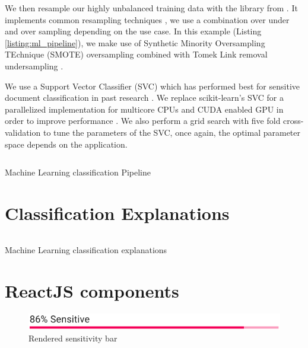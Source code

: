 \documentclass{l4proj}
\begin{document}
We then resample our highly unbalanced training data with the \textcite{ScikitlearncontribImbalancedlearn2020} library from \textcite{lemaitreImbalancedlearnPythonToolbox2017}.
It implements common resampling techniques \autocite{lemaitreImbalancedlearnPythonToolbox2017}, we use a combination over under and over sampling depending on the use case.
In this example (Listing \ref{listing:ml_pipeline}), we make use of Synthetic Minority Oversampling TEchnique (SMOTE) oversampling combined with Tomek Link removal undersampling \autocite{batistaStudyBehaviorSeveral2004}.

We use a Support Vector Classifier (SVC) which has performed best for sensitive document classification in past research \autocite{mcdonaldClassifierDigitalSensitivity2014,mcdonaldStudySVMKernel2017}.
We replace scikit-learn's SVC for a parallelized implementation for multicore CPUs and CUDA enabled GPU in order to improve performance \autocite{wenThunderSVMFastSVM2018}.
We also perform a grid search with five fold cross-validation to tune the parameters of the SVC, once again, the optimal parameter space depends on the application.

\begin{listing}[H]
    \inputminted{python}{code/ml_pipeline.py}
    \caption{Machine Learning classification Pipeline}
    \label{listing:ml_pipeline}
\end{listing}

\section{Classification Explanations}

\begin{listing}[H]
    \inputminted{python}{code/explanations.py}
    \caption{Machine Learning classification explanations}
    \label{listing:ml_explanations}
\end{listing}

\section{ReactJS components}

\begin{figure}
    \includegraphics[width=\linewidth]{figures/sensitivity_bar.pdf}
    \caption{Rendered sensitivity bar}

    \vspace{-10pt}
    \label{fig:sensitivity_bar_preview}
\end{figure}
\end{document}

